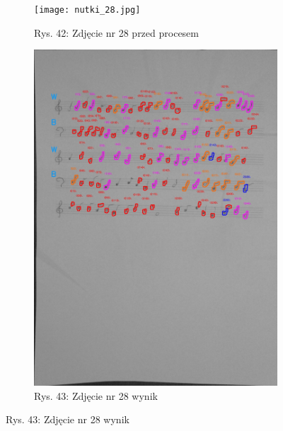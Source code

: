 \documentclass[11pt]{article}
\begin{document}
\begin{figure}
\begin{subfigure}[b]{0.475\textwidth}
        \centering
        \graphicspath{ {Resources/} }
        \texttt{[image: nutki\_28.jpg]}
        \caption[]%
        {{\small Rys. 42: Zdjęcie nr 28 przed procesem}}
        \label{fig:sub3}
    \end{subfigure}
    \quad
    \begin{subfigure}[b]{0.475\textwidth}
        \centering
        \graphicspath{ {blobs/} }
        \includegraphics[width=\textwidth]{28_cnts.jpg}
        \caption[]%
        {{\small Rys. 43: Zdjęcie nr 28 wynik}}
        \label{fig:sub 4}
    \end{subfigure}
    \label{fig 5}
\end{figure}

\FloatBarrier
\end{document}
